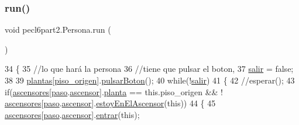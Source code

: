 \subsubsection{\texorpdfstring{run()}{run()}}
{\footnotesize\ttfamily void pecl6part2.\+Persona.\+run (\begin{DoxyParamCaption}{ }\end{DoxyParamCaption})\hspace{0.3cm}{\ttfamily [inline]}}


\begin{DoxyCode}
34     \{
35         \textcolor{comment}{//lo que hará la persona}
36         \textcolor{comment}{//tiene que pulsar el boton, }
37         \mbox{\hyperlink{classpecl6part2_1_1_persona_a929d460e971bd1271927110d189bd9b0}{salir}} = \textcolor{keyword}{false};
38         
39         \mbox{\hyperlink{classpecl6part2_1_1_persona_a8c92dc1ec730569cae9d9e4f7f04f6fc}{plantas}}[\mbox{\hyperlink{classpecl6part2_1_1_persona_a64acff116f7c56e347369ec54c9109ad}{piso\_origen}}].\mbox{\hyperlink{classpecl6part2_1_1_planta_a09569038a4c6626b58213853f0c58f06}{pulsarBoton}}();
40         \textcolor{keywordflow}{while}(!\mbox{\hyperlink{classpecl6part2_1_1_persona_a929d460e971bd1271927110d189bd9b0}{salir}})
41         \{
42             \textcolor{comment}{//esperar();}
43             \textcolor{keywordflow}{if}(\mbox{\hyperlink{classpecl6part2_1_1_persona_a3e0fca0322fb911f7fb38ad78b46b70f}{ascensores}}[\mbox{\hyperlink{classpecl6part2_1_1_persona_aa2db1862ae911bee400535c215f5740a}{paso}}.\mbox{\hyperlink{classpecl6part2_1_1_monitor_abfc1bfd2de962ac64f1c505d9dbe136a}{ascensor}}].\mbox{\hyperlink{classpecl6part2_1_1_ascensor_a66017643cc6554b17d447867a0c0d619}{planta}} == \textcolor{keyword}{this}.piso\_origen && !
      \mbox{\hyperlink{classpecl6part2_1_1_persona_a3e0fca0322fb911f7fb38ad78b46b70f}{ascensores}}[\mbox{\hyperlink{classpecl6part2_1_1_persona_aa2db1862ae911bee400535c215f5740a}{paso}}.\mbox{\hyperlink{classpecl6part2_1_1_monitor_abfc1bfd2de962ac64f1c505d9dbe136a}{ascensor}}].\mbox{\hyperlink{classpecl6part2_1_1_ascensor_a0ec994e509b6cddd706e1f6ee613d6f8}{estoyEnElAscensor}}(\textcolor{keyword}{this}))
44             \{
45                 \mbox{\hyperlink{classpecl6part2_1_1_persona_a3e0fca0322fb911f7fb38ad78b46b70f}{ascensores}}[\mbox{\hyperlink{classpecl6part2_1_1_persona_aa2db1862ae911bee400535c215f5740a}{paso}}.\mbox{\hyperlink{classpecl6part2_1_1_monitor_abfc1bfd2de962ac64f1c505d9dbe136a}{ascensor}}].\mbox{\hyperlink{classpecl6part2_1_1_ascensor_a39f39c41b77b0f31601a0afd10e38930}{entrar}}(\textcolor{keyword}{this});

\end{DoxyCode}
